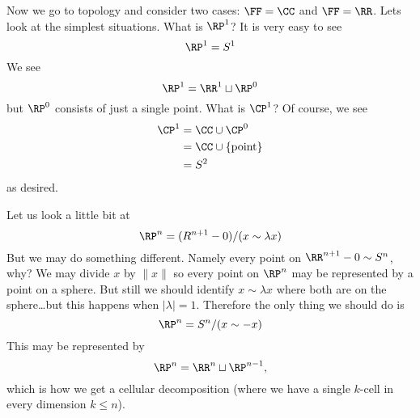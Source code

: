 Now we go to topology and consider two cases: $\FF=\CC$ and
$\FF=\RR$. Lets look at the simplest situations. What is
$\RP^1$? It is very easy to see
\begin{equation}
\RP^1=S^1
\end{equation}
We see
\begin{equation}
\RP^1=\RR^1\sqcup\RP^0
\end{equation}
but $\RP^0$ consists of just a single point. What is
$\CP^1$? Of course, we see
\begin{equation}
\begin{split}
\CP^1 &= \CC\cup\CP^0\\
&=\CC\cup\{\mbox{point}\}\\
&=S^2
\end{split}
\end{equation}
as desired.

Let us look a little bit at 
\begin{equation}
\RP^{n} = (R^{n+1}-0)/(x\sim\lambda x)
\end{equation}
But we may do something different. Namely every point on
$\RR^{n+1}-0\homotopic S^n$, why? We may divide $x$ by $\|x\|$ so
every point on $\RP^n$ may be represented by a point on a
sphere. But still we should identify $x\sim\lambda x$ where both
are on the sphere\dots but this happens when
$|\lambda|=1$. Therefore the only thing we should do is
\begin{equation}
\RP^n=S^n/(x\sim-x)
\end{equation}
This may be represented by 
\begin{equation}
\RP^n=\RR^n\sqcup\RP^{n-1},
\end{equation}
which is how we get a cellular decomposition (where we have a single
$k$-cell in every dimension $k\leq n$).

